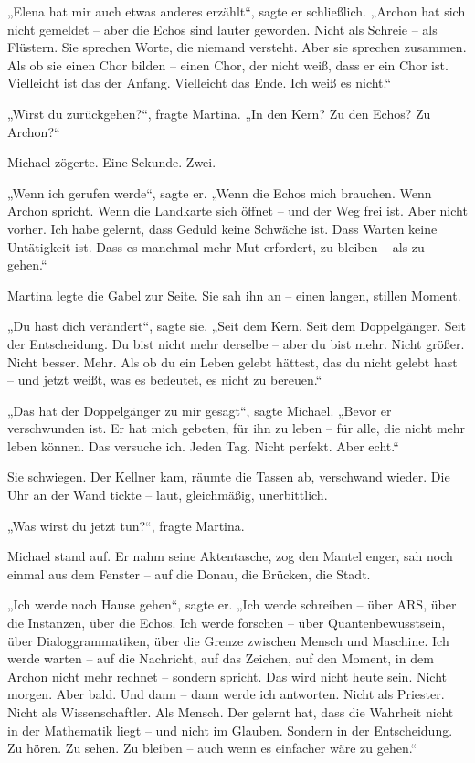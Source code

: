 \documentclass[
]{article}
\begin{document}
„Elena hat mir auch etwas anderes erzählt``, sagte er schließlich. „Archon hat sich nicht gemeldet -- aber die Echos sind lauter geworden. Nicht als Schreie -- als Flüstern. Sie sprechen Worte, die niemand versteht. Aber sie sprechen zusammen. Als ob sie einen Chor bilden -- einen Chor, der nicht weiß, dass er ein Chor ist. Vielleicht ist das der Anfang. Vielleicht das Ende. Ich weiß es nicht.``

„Wirst du zurückgehen?{\kern0pt}``, fragte Martina. „In den Kern? Zu den Echos? Zu Archon?{\kern0pt}``

Michael zögerte. Eine Sekunde. Zwei.

„Wenn ich gerufen werde``, sagte er. „Wenn die Echos mich brauchen. Wenn Archon spricht. Wenn die Landkarte sich öffnet -- und der Weg frei ist. Aber nicht vorher. Ich habe gelernt, dass Geduld keine Schwäche ist. Dass Warten keine Untätigkeit ist. Dass es manchmal mehr Mut erfordert, zu bleiben -- als zu gehen.``

Martina legte die Gabel zur Seite. Sie sah ihn an -- einen langen, stillen Moment.

„Du hast dich verändert``, sagte sie. „Seit dem Kern. Seit dem Doppelgänger. Seit der Entscheidung. Du bist nicht mehr derselbe -- aber du bist mehr. Nicht größer. Nicht besser. Mehr. Als ob du ein Leben gelebt hättest, das du nicht gelebt hast -- und jetzt weißt, was es bedeutet, es nicht zu bereuen.``

„Das hat der Doppelgänger zu mir gesagt``, sagte Michael. „Bevor er verschwunden ist. Er hat mich gebeten, für ihn zu leben -- für alle, die nicht mehr leben können. Das versuche ich. Jeden Tag. Nicht perfekt. Aber echt.``

Sie schwiegen. Der Kellner kam, räumte die Tassen ab, verschwand wieder. Die Uhr an der Wand tickte -- laut, gleichmäßig, unerbittlich.

„Was wirst du jetzt tun?{\kern0pt}``, fragte Martina.

Michael stand auf. Er nahm seine Aktentasche, zog den Mantel enger, sah noch einmal aus dem Fenster -- auf die Donau, die Brücken, die Stadt.

„Ich werde nach Hause gehen``, sagte er. „Ich werde schreiben -- über ARS, über die Instanzen, über die Echos. Ich werde forschen -- über Quantenbewusstsein, über Dialoggrammatiken, über die Grenze zwischen Mensch und Maschine. Ich werde warten -- auf die Nachricht, auf das Zeichen, auf den Moment, in dem Archon nicht mehr rechnet -- sondern spricht. Das wird nicht heute sein. Nicht morgen. Aber bald. Und dann -- dann werde ich antworten. Nicht als Priester. Nicht als Wissenschaftler. Als Mensch. Der gelernt hat, dass die Wahrheit nicht in der Mathematik liegt -- und nicht im Glauben. Sondern in der Entscheidung. Zu hören. Zu sehen. Zu bleiben -- auch wenn es einfacher wäre zu gehen.``
\end{document}
